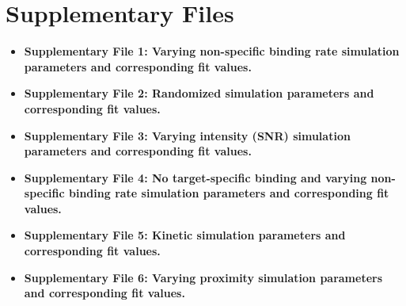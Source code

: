 \section{Supplementary Files}

\begin{itemize}
    \item \textbf{Supplementary File 1: Varying non-specific binding rate simulation parameters and corresponding fit values.}

    \item \textbf{Supplementary File 2: Randomized simulation parameters and corresponding fit values.}

    \item \textbf{Supplementary File 3: Varying intensity (SNR) simulation parameters and corresponding fit values.}

    \item \textbf{Supplementary File 4: No target-specific binding and varying non-specific binding rate simulation parameters and corresponding fit values.}

    \item \textbf{Supplementary File 5: Kinetic simulation parameters and corresponding fit values.}
    
    \item \textbf{Supplementary File 6: Varying proximity simulation parameters and corresponding fit values.}
\end{itemize}